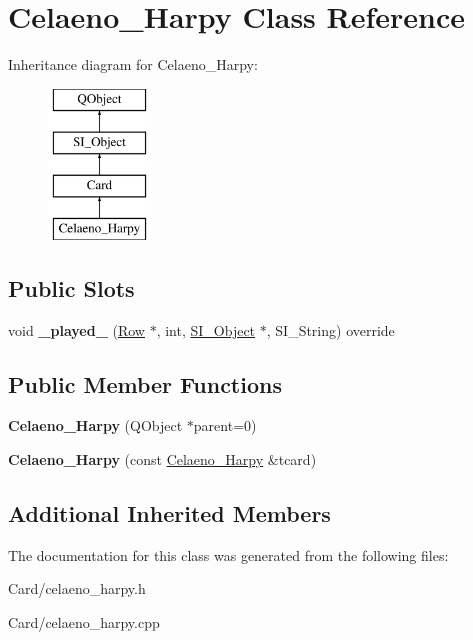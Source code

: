 \hypertarget{class_celaeno___harpy}{}\section{Celaeno\+\_\+\+Harpy Class Reference}
\label{class_celaeno___harpy}
Inheritance diagram for Celaeno\+\_\+\+Harpy\+:\begin{figure}[H]
\begin{center}
\leavevmode
\includegraphics[height=4.000000cm]{class_celaeno___harpy}
\end{center}
\end{figure}
\subsection*{Public Slots}
\begin{DoxyCompactItemize}
\item 
\mbox{\label{class_celaeno___harpy_ab03565ecef939a86bf613244c8cfd41f}} 
void {\bfseries \+\_\+played\+\_\+} (\hyperlink{class_card_set}{Row} $\ast$, int, \hyperlink{class_s_i___object}{S\+I\+\_\+\+Object} $\ast$, S\+I\+\_\+\+String) override
\end{DoxyCompactItemize}
\subsection*{Public Member Functions}
\begin{DoxyCompactItemize}
\item 
\mbox{\label{class_celaeno___harpy_a49761fff0932d16af766a310b0ac3ca0}} 
{\bfseries Celaeno\+\_\+\+Harpy} (Q\+Object $\ast$parent=0)
\item 
\mbox{\label{class_celaeno___harpy_a419c5fd1e353fc48e17113131e61accd}} 
{\bfseries Celaeno\+\_\+\+Harpy} (const \hyperlink{class_celaeno___harpy}{Celaeno\+\_\+\+Harpy} \&tcard)
\end{DoxyCompactItemize}
\subsection*{Additional Inherited Members}


The documentation for this class was generated from the following files\+:\begin{DoxyCompactItemize}
\item 
Card/celaeno\+\_\+harpy.\+h\item 
Card/celaeno\+\_\+harpy.\+cpp\end{DoxyCompactItemize}
